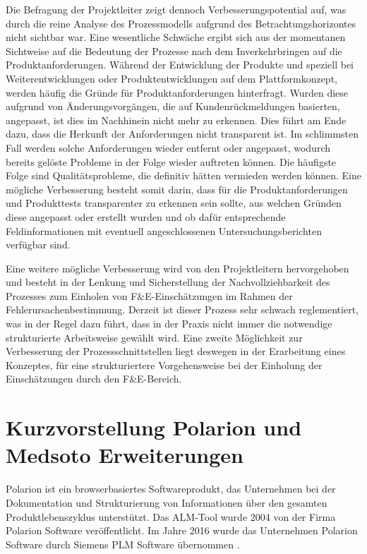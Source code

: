 \documentclass[a4paper,12pt]{report}
\begin{document}
Die Befragung der Projektleiter zeigt dennoch Verbesserungspotential auf, was durch die reine Analyse des Prozessmodells aufgrund des Betrachtungshorizontes nicht sichtbar war. Eine wesentliche Schwäche ergibt sich aus der momentanen Sichtweise auf die Bedeutung der Prozesse nach dem Inverkehrbringen auf die Produktanforderungen. Während der Entwicklung der Produkte und speziell bei Weiterentwicklungen oder Produktentwicklungen auf dem Plattformkonzept, werden häufig die Gründe für Produktanforderungen hinterfragt. Wurden diese aufgrund von Änderungsvorgängen, die auf Kundenrückmeldungen basierten, angepasst, ist dies im Nachhinein nicht mehr zu erkennen. Dies führt am Ende dazu, dass die Herkunft der Anforderungen nicht transparent ist. Im schlimmsten Fall werden solche Anforderungen wieder entfernt oder angepasst, wodurch bereits gelöste Probleme in der Folge wieder auftreten können. Die häufigste Folge sind Qualitätsprobleme, die definitiv hätten vermieden werden können. Eine mögliche Verbesserung besteht somit darin, dass für die Produktanforderungen und Produkttests transparenter zu erkennen sein sollte, aus welchen Gründen diese angepasst oder erstellt wurden und ob dafür entsprechende Feldinformationen mit eventuell angeschlossenen Untersuchungsberichten verfügbar sind.

Eine weitere mögliche Verbesserung wird von den Projektleitern hervorgehoben und besteht in der Lenkung und Sicherstellung der Nachvollziehbarkeit des Prozesses zum Einholen von F\&E-Einschätzungen im Rahmen der Fehlerursachenbestimmung. Derzeit ist dieser Prozess sehr schwach reglementiert, was in der Regel dazu führt, dass in der Praxis nicht immer die notwendige strukturierte Arbeitsweise gewählt wird. Eine zweite Möglichkeit zur Verbesserung der Prozessschnittstellen liegt deswegen in der Erarbeitung eines Konzeptes, für eine strukturiertere Vorgehensweise bei der Einholung der Einschätzungen durch den F\&E-Bereich.
\section{Kurzvorstellung Polarion und Medsoto Erweiterungen}
Polarion ist ein browserbasiertes Softwareprodukt, das Unternehmen bei der Dokumentation und Strukturierung von Informationen über den gesamten Produktlebenszyklus unterstützt. Das ALM-Tool wurde 2004 von der Firma Polarion Software veröffentlicht. Im Jahre 2016 wurde das Unternehmen Polarion Software durch Siemens PLM Software übernommen \citep[vgl.][]{PolarionAbout}.
\end{document}
